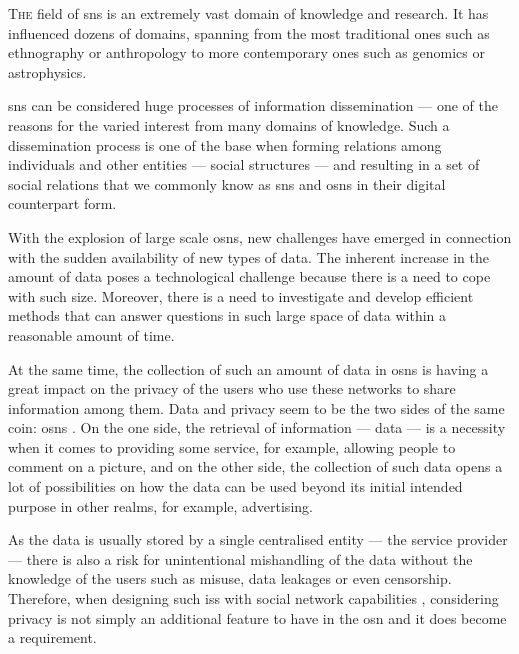 

\lettrine{\textcolor[gray]{.25}{T}}{he} field of \acp{sn} is an extremely vast domain 
of knowledge and research. It has influenced dozens of domains, spanning from the 
most traditional ones such as ethnography or anthropology to more contemporary ones 
such as genomics or astrophysics.

\Acp{sn} can be considered huge processes of information dissemination --- one of 
the reasons for the varied interest from many domains of knowledge. Such a dissemination 
process is one of the base when forming relations among individuals and other entities 
--- social structures --- and resulting in a set of social relations that we commonly 
know as \acp{sn} and \acp{osn} in their digital counterpart form.

With the explosion of large scale \acp{osn}, new challenges have emerged in connection 
with the sudden availability of new types of data. The inherent increase in the 
amount of data poses a technological challenge because there is a need to cope with 
such size. Moreover, there is a need to investigate and develop efficient methods 
that can answer questions in such large space of data within a reasonable amount 
of time.

At the same time, the collection of such an amount of data in \acp{osn} is having 
a great impact on the privacy of the users who use these networks to share information 
among them. Data and privacy seem to be the two sides of the same coin: \acp{osn} 
\cite{BelkinC92}. On the one side, the retrieval of information --- data --- is 
a necessity when it comes to providing some service, for example, allowing people 
to comment on a picture, and on the other side, the collection of such data opens 
a lot of possibilities on how the data can be used beyond its initial intended purpose 
in other realms, for example, advertising.

As the data is usually stored by a single centralised entity --- the service provider --- 
there is also a risk for unintentional mishandling of the data without the knowledge 
of the users such as misuse, data leakages or even censorship. Therefore, when designing 
such \acp{is} with social network capabilities \cite{Abrams06, Lunt06, Lunt07, Zhu08, Lunt09}, 
considering privacy is not simply an additional feature to have in the \ac{osn} 
and it does become a requirement. 

